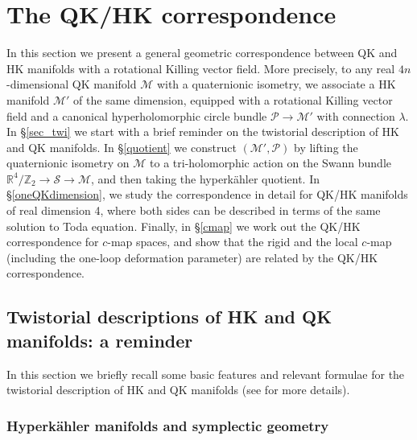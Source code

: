 \documentclass[12pt,reqno]{article}
\numberwithin{equation}{section}
\newcommand{\cS}{\mathcal{S}}
\newcommand{\cM}{\mathcal{M}}
\newcommand{\cP}{\mathcal{P}}
\newcommand{\IR}{\mathbb{R}}
\newcommand{\IZ}{\mathbb{Z}}
\newcommand{\hk}{{hyperk\"ahler}\xspace}
\def\pcM{\cM'}
\def\conhyper{\lambda}
\numberwithin{equation}{section}
\begin{document}
\section{The QK/HK correspondence}
\label{seq_qkhk}

In this section we present a general geometric correspondence between
QK and HK manifolds with a rotational
Killing vector field. More precisely, to any real $4n$-dimensional QK manifold
$\cM$ with a quaternionic isometry, we associate a
HK manifold $\pcM$ of the same dimension, equipped with a rotational Killing vector field and
 a canonical hyperholomorphic circle bundle $\cP\rightarrow \pcM$ with
connection $\conhyper$.
In \S \ref{sec_twi} we start with a brief reminder on the twistorial description
of HK and QK manifolds.
In \S \ref{quotient} we construct $(\pcM,\cP)$ by lifting the quaternionic
isometry on $\cM$ to a  tri-holomorphic action
on the Swann bundle $\IR^4/\IZ_2\rightarrow \cS\rightarrow \cM$, and
then taking the \hk quotient.
In \S \ref{oneQKdimension},
we study the correspondence in detail for QK/HK manifolds of real dimension 4, where
both sides can be described in terms of the same solution to Toda equation.
Finally, in \S \ref{cmap} we work out the QK/HK correspondence for $c$-map spaces,
and show that the  rigid and the local $c$-map (including the one-loop deformation
parameter) are related by the QK/HK correspondence.





\subsection{Twistorial descriptions of HK and QK manifolds: a reminder\label{sec_twi}}

In this section we briefly recall some basic features and relevant formulae for the twistorial description of HK
and QK manifolds (see \cite{Alexandrov:2008ds,Alexandrov:2008nk} for more details).



\subsubsection{Hyperk\"ahler manifolds and symplectic geometry \label{sec_twihk}}
\end{document}
